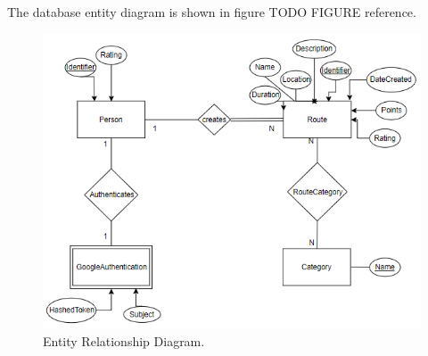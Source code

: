 The database entity diagram is shown in figure TODO FIGURE reference.

\begin{figure}[h]            
    \includegraphics[width=\textwidth]{images/project-structure/dbms-structure.PNG}
    \caption{Entity Relationship Diagram.}
\end{figure}   
